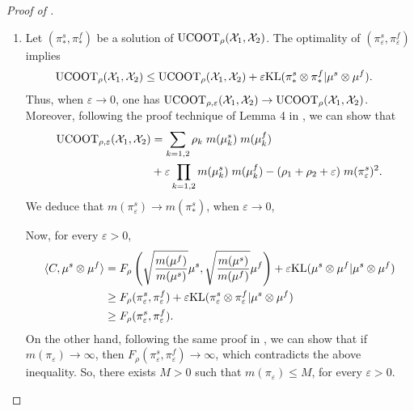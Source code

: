 \begin{proof}[Proof of ]
\begin{enumerate}
    \item Let $(\pi_*^s, \pi_*^f)$ be a solution of $\text{UCOOT}_{\rho}(\mathcal X_1, \mathcal X_2)$.
    The optimality of $(\pi_{\varepsilon}^s, \pi_{\varepsilon}^f)$ implies
    \begin{equation}
      \begin{split}
        \text{UCOOT}_{\rho}(\mathcal X_1, \mathcal X_2)
      &\leq \text{UCOOT}_{\rho}(\mathcal X_1, \mathcal X_2) +
      \varepsilon \text{KL}(\pi_*^s \otimes \pi_*^f \vert \mu^s \otimes \mu^f).
      \end{split}
    \end{equation}
    Thus, when $\varepsilon \to 0$, one has
    $\text{UCOOT}_{\rho, \varepsilon}(\mathcal X_1, \mathcal X_2) \to \text{UCOOT}_{\rho}(\mathcal X_1, \mathcal X_2)$. Moreover,
    following the proof technique of Lemma 4 in \citep{Khiem20}, we can show that
    \begin{align}
      \text{UCOOT}_{\rho, \varepsilon}(\mathcal X_1, \mathcal X_2) &=
      \sum_{k=1, 2} \rho_k \; m(\mu_k^s) \; m(\mu_k^f) \\
      &+ \varepsilon \prod_{k=1, 2} m(\mu_k^s) \; m(\mu_k^f)
      - (\rho_1  + \rho_2 + \varepsilon) \; m(\pi^s_{\varepsilon})^2.
    \end{align}
    We deduce that $m(\pi^s_{\varepsilon}) \to m(\pi^s_*)$, when $\varepsilon \to 0$,

    Now, for every $\varepsilon > 0$,
    \begin{equation}
      \begin{split}
        \langle C, \mu^s \otimes \mu^f \rangle &=
        F_{\rho} \left( \sqrt{\frac{m(\mu^f)}{m(\mu^s)}} \mu^s, \sqrt{\frac{m(\mu^s)}{m(\mu^f)}} \mu^f \right) +
        \varepsilon \text{KL}( \mu^s \otimes \mu^f \vert \mu^s \otimes \mu^f ) \\
        &\geq F_{\rho}(\pi_{\varepsilon}^s, \pi_{\varepsilon}^f) +
        \varepsilon \text{KL}(\pi_{\varepsilon}^s \otimes \pi_{\varepsilon}^f \vert \mu^s \otimes \mu^f) \\
        &\geq F_{\rho}(\pi_{\varepsilon}^s, \pi_{\varepsilon}^f).
      \end{split}
    \end{equation}
    On the other hand, following the same proof in ,
    we can show that if
    $m(\pi_{\varepsilon}) \to \infty$, then
    $F_{\rho}(\pi_{\varepsilon}^s, \pi_{\varepsilon}^f) \to \infty$, which
    contradicts the above inequality. So, there exists $M > 0$ such that
    $m(\pi_{\varepsilon}) \leq M$, for every $\varepsilon > 0$.


\end{enumerate}
\end{proof}
